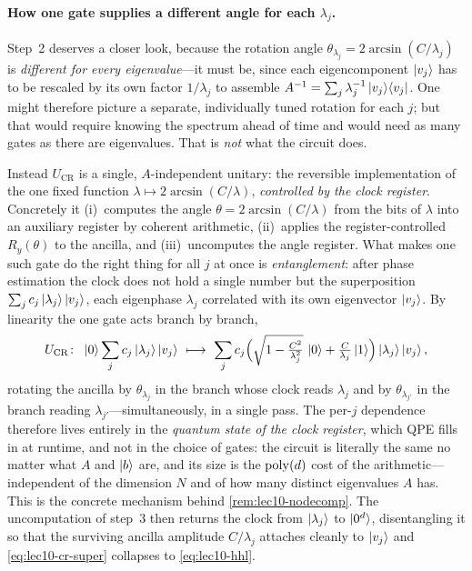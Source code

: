\paragraph{How one gate supplies a different angle for each $\lambda_j$.}
Step~2 deserves a closer look, because the rotation angle
$\theta_{\lambda_j}=2\arcsin(C/\lambda_j)$ is \emph{different for every eigenvalue}---it
must be, since each eigencomponent $\ket{v_j}$ has to be rescaled by its own factor
$1/\lambda_j$ to assemble $A^{-1}=\sum_j\lambda_j^{-1}\ket{v_j}\!\bra{v_j}$. One might therefore
picture a separate, individually tuned rotation for each $j$; but that would require
knowing the spectrum ahead of time and would need as many gates as there are eigenvalues.
That is \emph{not} what the circuit does.

Instead $U_{\mathrm{CR}}$ is a single, $A$-independent unitary: the reversible
implementation of the one fixed function $\lambda\mapsto2\arcsin(C/\lambda)$,
\emph{controlled by the clock register}. Concretely it (i)~computes the angle
$\theta=2\arcsin(C/\lambda)$ from the bits of $\lambda$ into an auxiliary register by
coherent arithmetic, (ii)~applies the register-controlled $R_y(\theta)$ to the ancilla,
and (iii)~uncomputes the angle register. What makes one such gate do the right thing for
all $j$ at once is \emph{entanglement}: after phase estimation the clock does not hold a
single number but the superposition $\sum_j c_j\ket{\lambda_j}\ket{v_j}$, each eigenphase
$\lambda_j$ correlated with its own eigenvector $\ket{v_j}$. By linearity the one gate
acts branch by branch,
\begin{equation}
  U_{\mathrm{CR}}\colon\ \ket0\sum_j c_j\ket{\lambda_j}\ket{v_j}
  \ \longmapsto\
  \sum_j c_j\Bigl(\sqrt{1-\tfrac{C^2}{\lambda_j^2}}\,\ket0+\tfrac{C}{\lambda_j}\ket1\Bigr)
    \ket{\lambda_j}\ket{v_j},
  \label{eq:lec10-cr-super}
\end{equation}
rotating the ancilla by $\theta_{\lambda_j}$ in the branch whose clock reads $\lambda_j$
and by $\theta_{\lambda_{j'}}$ in the branch reading $\lambda_{j'}$---simultaneously, in a
single pass. The per-$j$ dependence therefore lives entirely in the \emph{quantum state of
the clock register}, which QPE fills in at runtime, and not in the choice of gates: the
circuit is literally the same no matter what $A$ and $\ket b$ are, and its size is the
$\operatorname{poly}(d)$ cost of the arithmetic---independent of the dimension $N$ and of how many
distinct eigenvalues $A$ has. This is the concrete mechanism behind
\cref{rem:lec10-nodecomp}. The uncomputation of step~3 then returns the clock from
$\ket{\lambda_j}$ to $\ket{0^d}$, disentangling it so that the surviving ancilla amplitude
$C/\lambda_j$ attaches cleanly to $\ket{v_j}$ and \eqref{eq:lec10-cr-super} collapses to
\eqref{eq:lec10-hhl}.

